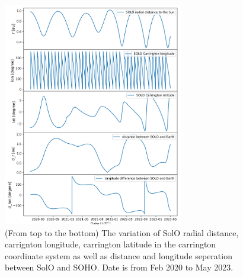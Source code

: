 \begin{figure}
    \centering
    \includegraphics[width = 0.7\textwidth]{images/ACR/SOLO_orbit_helioscentric_3.png}
    \caption[The orbit variation of \ac{SolO} in carrington coordinate system]{(From top to the bottom) The variation of \ac{SolO} radial distance, carrignton longitude, carrington latitude in the carrington coordinate system as well as distance and longitude seperation between \ac{SolO} and \ac{SOHO}. Date is from Feb 2020 to May 2023. }
    \label{fig:SOLO_orbit_info}
\end{figure}
